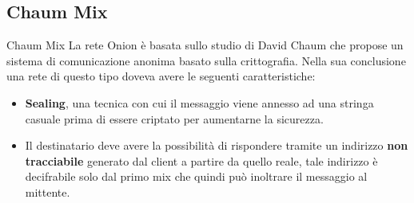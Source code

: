 \begin{frame}
    \begin{figure}[htpb!]
        \centering
        
    \end{figure}
\end{frame}

\subsection{Chaum Mix}
\begin{frame}{Chaum Mix}
    La rete Onion è basata sullo studio di David Chaum che propose un sistema di comunicazione anonima basato sulla crittografia. Nella sua conclusione una rete di questo tipo doveva avere le seguenti caratteristiche:
    \begin{itemize}
        \item \textbf{Sealing}, una tecnica con cui il messaggio viene annesso ad una stringa casuale prima di essere criptato per aumentarne la sicurezza.
        \item Il destinatario deve avere la possibilità di rispondere tramite un indirizzo \textbf{non tracciabile} generato dal client a partire da quello reale, tale indirizzo è decifrabile solo dal primo mix che quindi può inoltrare il messaggio al mittente.
    \end{itemize}
\end{frame}